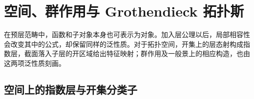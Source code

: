 
\section{空间、群作用与 Grothendieck 拓扑斯}
\label{b4:sec:E03}

在预层范畴中，函数和子对象本身也可表示为对象。加入层公理以后，局部相容性会改变其中的公式，却保留同样的泛性质。对于拓扑空间，开集上的层态射构成指数层，截面落入子层的开区域给出特征映射；群作用及一般景上的相应构造，也由这两项泛性质刻画。

\subsection{空间上的指数层与开集分类子}
\label{b4:subsec:E03:01}

